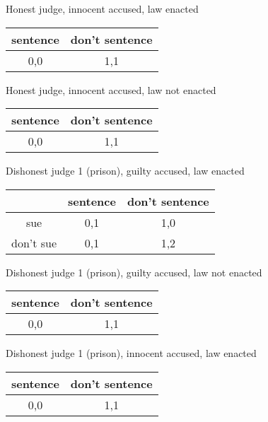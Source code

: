 \documentclass[a4paper, 12pt]{article}
\begin{document}
\begin{center}
  Honest judge, innocent accused, law enacted
  \\
  \begin{tabular}{|c|c|}
	\hline
	sentence & don't sentence \\\hline
	0,0 & 1,1 \\\hline
  \end{tabular}
\end{center}

\begin{center}
  Honest judge, innocent accused, law not enacted
  \\
  \begin{tabular}{|c|c|}
	\hline
	sentence & don't sentence \\\hline
	0,0 & 1,1 \\\hline
  \end{tabular}
\end{center}

\begin{center}
  Dishonest judge 1 (prison), guilty accused, law enacted
  \\
  \begin{tabular}{|c|c|c|}
	\hline
	& sentence & don't sentence \\\hline
	sue &  0,1 & 1,0 \\\hline
	don't sue & 0,1 & 1,2 \\\hline
  \end{tabular}
\end{center}

\begin{center}
  Dishonest judge 1 (prison), guilty accused, law not enacted
  \\
  \begin{tabular}{|c|c|}
	\hline
	sentence & don't sentence \\\hline
	0,0 & 1,1 \\\hline
  \end{tabular}
\end{center}

\begin{center}
  Dishonest judge 1 (prison), innocent accused, law enacted
  \\
  \begin{tabular}{|c|c|}
	\hline
	sentence & don't sentence \\\hline
	0,0 & 1,1 \\\hline
  \end{tabular}
\end{center}
\end{document}
